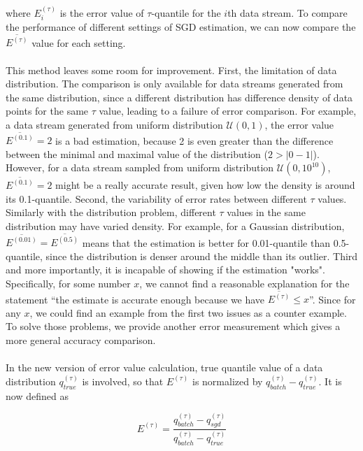     
where $E^{(\tau)}_{i}$ is the error value of $\tau$-quantile for the $i$th data stream. To compare the performance of different settings of SGD estimation, we can now compare the $\overline{E^{(\tau)}}$ value for each setting.
\\\\
This method leaves some room for improvement. 
First, the limitation of data distribution. The comparison is only available for data streams generated from the same distribution, since a different distribution has difference density of data points for the same $\tau$ value, leading to a failure of error comparison. For example, a data stream generated from uniform distribution $\mathcal{U}(0,1)$, the error value $\overline{E^{(0.1)}} = 2$ is a bad estimation, because 2 is even greater than the difference between the minimal and maximal value of the distribution ($2 > |0-1|$). However, for a data stream sampled from uniform distribution $\mathcal{U}(0,10^{10})$, $\overline{E^{(0.1)}} = 2$ might be a really accurate result, given how low the density is around its 0.1-quantile. 
 Second, the variability of error rates between different $\tau$ values. Similarly with the distribution problem, different $\tau$ values in the same distribution may have varied density. For example, for a Gaussian distribution, $\overline{E^{(0.01)}} = \overline{E^{(0.5)}}$ means that the estimation is better for 0.01-quantile than 0.5-quantile, since the distribution is denser around the middle than its outlier.
 Third and more importantly, it is incapable of showing if the estimation "works". Specifically, for some number $x$, we cannot find a reasonable explanation for the statement ``the estimate is accurate enough because we have $\overline{E^{(\tau)}} \leq x$''. Since for any $x$, we could find an example from the first two issues as a counter example. To solve those problems, we provide another error measurement which gives a more general accuracy comparison.
\\\\
In the new version of error value calculation, true quantile value of a data distribution $q_{true}^{(\tau)}$ is involved, so that $E^{(\tau)}$ is normalized by $q_{batch}^{(\tau)} - q_{true}^{(\tau)}$. It is now defined as

\begin{equation}
    E^{(\tau)} = \frac{q_{batch}^{(\tau)} - q_{sgd}^{(\tau)}}
                      {q_{batch}^{(\tau)} - q_{true}^{(\tau)}}
\end{equation}
    

